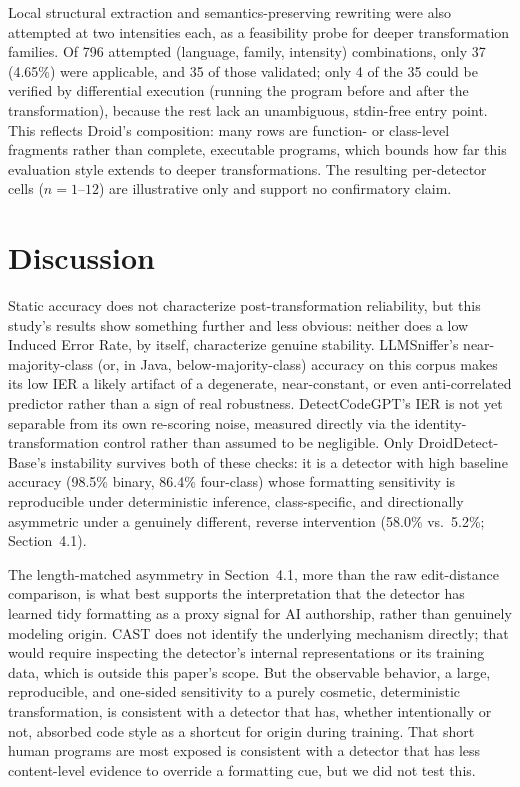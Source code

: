\documentclass[sigconf,review,anonymous]{acmart}
\begin{document}
Local structural extraction and semantics-preserving rewriting were also attempted at two intensities each, as a feasibility probe for deeper transformation families. Of 796 attempted (language, family, intensity) combinations, only 37 (4.65\%) were applicable, and 35 of those validated; only 4 of the 35 could be verified by differential execution (running the program before and after the transformation), because the rest lack an unambiguous, stdin-free entry point. This reflects Droid's composition: many rows are function- or class-level fragments rather than complete, executable programs, which bounds how far this evaluation style extends to deeper transformations. The resulting per-detector cells ($n{=}1$--$12$) are illustrative only and support no confirmatory claim.

\section{Discussion}

Static accuracy does not characterize post-transformation reliability, but this study's results show something further and less obvious: neither does a low Induced Error Rate, by itself, characterize genuine stability. LLMSniffer's near-majority-class (or, in Java, below-majority-class) accuracy on this corpus makes its low IER a likely artifact of a degenerate, near-constant, or even anti-correlated predictor rather than a sign of real robustness. DetectCodeGPT's IER is not yet separable from its own re-scoring noise, measured directly via the identity-transformation control rather than assumed to be negligible. Only DroidDetect-Base's instability survives both of these checks: it is a detector with high baseline accuracy (98.5\% binary, 86.4\% four-class) whose formatting sensitivity is reproducible under deterministic inference, class-specific, and directionally asymmetric under a genuinely different, reverse intervention (58.0\% vs.\ 5.2\%; Section~4.1).

The length-matched asymmetry in Section~4.1, more than the raw edit-distance comparison, is what best supports the interpretation that the detector has learned tidy formatting as a proxy signal for AI authorship, rather than genuinely modeling origin. CAST does not identify the underlying mechanism directly; that would require inspecting the detector's internal representations or its training data, which is outside this paper's scope. But the observable behavior, a large, reproducible, and one-sided sensitivity to a purely cosmetic, deterministic transformation, is consistent with a detector that has, whether intentionally or not, absorbed code style as a shortcut for origin during training. That short human programs are most exposed is consistent with a detector that has less content-level evidence to override a formatting cue, but we did not test this.
\end{document}
